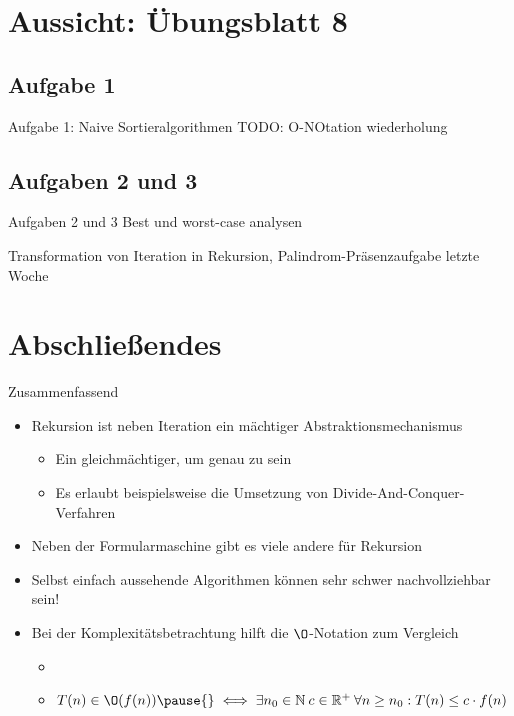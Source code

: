 \iffull
{}
\section{Aussicht: Übungsblatt 8}
\subsection{Aufgabe 1}
\begin{frame}{Aufgabe 1: Naive Sortieralgorithmen}
TODO: O-NOtation wiederholung
\end{frame}

\subsection{Aufgaben 2 und 3}
\begin{frame}{Aufgaben 2 und 3}
Best und worst-case analysen

Transformation von Iteration in Rekursion, Palindrom-Präsenzaufgabe letzte Woche
\end{frame}
\fi

\section{Abschließendes}
{\SummaryFrame
\begin{frame}[t]{Zusammenfassend}
\pause \printBibCommand
\vfill\vfill %
\begin{itemize}[<+(1)->]
    \itemsep6.5pt
    \item Rekursion ist neben Iteration ein mächtiger Abstraktionsmechanismus \begin{itemize}
        \item Ein gleichmächtiger, um genau zu sein
        \item Es erlaubt beispielsweise die Umsetzung von Divide-And-Conquer-Verfahren
    \end{itemize}
    \item Neben der Formularmaschine gibt es viele andere  für Rekursion
    \item Selbst einfach aussehende Algorithmen können sehr schwer nachvollziehbar sein!
    \item Bei der Komplexitätsbetrachtung hilft die \(\O\)-Notation zum Vergleich \begin{itemize}
        \item {}
        \item \(T(n) \in \O(f(n))\pause{}\iff \exists n_0 \in \mathbb{N}\: c \in \mathbb{R}^+\: \forall n \geq n_0: T(n) \leq c \cdot f(n)\)
    \end{itemize}
\end{itemize}
\end{frame}
}

